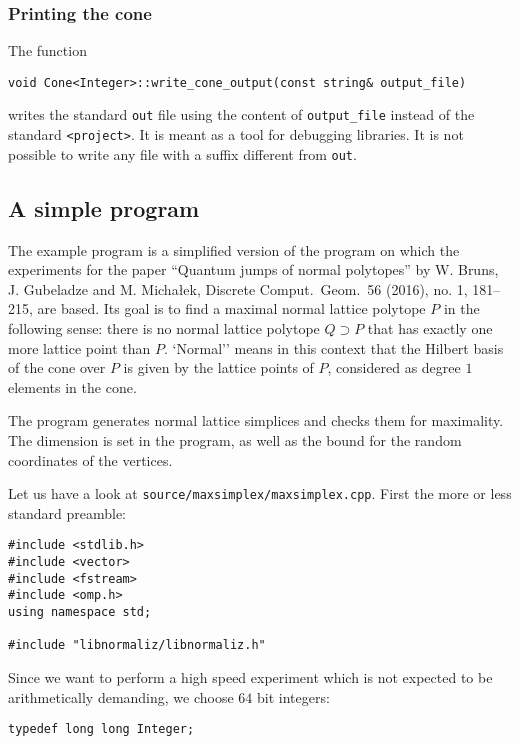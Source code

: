 \documentclass[12pt,a4paper]{scrartcl}
\theoremstyle{definition}
\begin{document}
\begin{small}
\subsubsection{Printing  the cone}

The function
\begin{Verbatim}
void Cone<Integer>::write_cone_output(const string& output_file)
\end{Verbatim}

writes the standard \verb|out| file using the content of \verb|output_file| instead of the standard \verb|<project>|. It is meant as a tool for debugging libraries. It is not possible to write any file with a suffix different from \verb|out|.

\subsection{A simple program}\label{maxsimplex}

The example program is a simplified version of the program on which the experiments for the paper ``Quantum jumps of normal polytopes'' by  W. Bruns, J. Gubeladze and M. Micha\l{}ek, Discrete Comput.\ Geom.\ 56 (2016), no. 1, 181--215, are based. Its goal is to find a maximal normal lattice polytope $P$ in the following sense: there is no normal lattice polytope $Q\supset P$ that has exactly one more lattice point than $P$. `Normal'' means in this context that the Hilbert basis of the cone over $P$ is given by the lattice points of $P$, considered as degree $1$ elements in the cone. 

The program generates normal lattice simplices and checks them for maximality. The dimension is set in the program, as well as the bound for the random coordinates of the vertices.

Let us have a look at \verb|source/maxsimplex/maxsimplex.cpp|. First the more or less standard preamble:

\begin{Verbatim}
#include <stdlib.h>
#include <vector>
#include <fstream>
#include <omp.h>
using namespace std;

#include "libnormaliz/libnormaliz.h"
\end{Verbatim}

Since we want to perform a high speed experiment which is not expected to be arithmetically demanding, we choose $64$ bit integers:
\begin{Verbatim}
typedef long long Integer;
\end{Verbatim}


\end{small}
\end{document}
